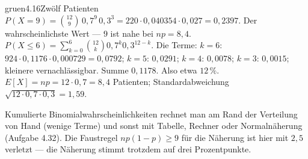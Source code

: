 \begin{loesungkarte}{gruen}{4.16}{Zwölf Patienten}
$P(X = 9) = \binom{12}9\,0{,}7^{9}\,0{,}3^{3} = 220\cdot0{,}040354\cdot0{,}027 = 0{,}2397$. Der wahrscheinlichste Wert --- $9$ ist nahe bei $np = 8{,}4$.
$P(X\le6) = \sum_{k=0}^{6}\binom{12}k0{,}7^{k}0{,}3^{12-k}$. Die Terme: $k = 6$: $924\cdot0{,}1176\cdot0{,}000729 = 0{,}0792$; $k = 5$: $0{,}0291$; $k = 4$: $0{,}0078$; $k = 3$: $0{,}0015$; kleinere vernachlässigbar. Summe $0{,}1178$. Also etwa $12\,\%$.
$E[X] = np = 12\cdot0{,}7 = 8{,}4$ Patienten; Standardabweichung $\sqrt{12\cdot0{,}7\cdot0{,}3} = 1{,}59$.
\begin{mitnehmen}\kastentext
Kumulierte Binomialwahrscheinlichkeiten rechnet man am Rand der Verteilung von Hand (wenige Terme) und sonst mit Tabelle, Rechner oder Normalnäherung (Aufgabe 4.32). Die Faustregel $np(1 - p)\ge9$ für die Näherung ist hier mit $2{,}5$ verletzt --- die Näherung stimmt trotzdem auf drei Prozentpunkte.
\end{mitnehmen}
\end{loesungkarte}

